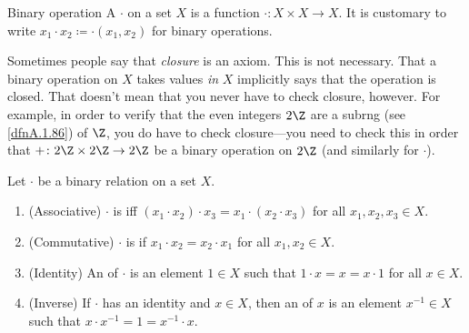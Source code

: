 \begin{dfn}{Binary operation}{}
A  $\cdot$ on a set $X$ is a function $\cdot :X\times X\rightarrow X$.  It is customary to write $x_1\cdot x_2\coloneqq \cdot (x_1,x_2)$ for binary operations.
\begin{rmk}
Sometimes people say that \emph{closure} is an axiom.  This is not necessary.  That a binary operation on $X$ takes values \emph{in} $X$ implicitly says that the operation is closed.  That doesn't mean that you never have to check closure, however.  For example, in order to verify that the even integers $2\Z$ are a subrng (see \cref{dfnA.1.86}) of $\Z$, you do have to check closure---you need to check this in order that $+\colon 2\Z \times 2\Z \rightarrow 2\Z$ be a binary operation on $2\Z$ (and similarly for $\cdot$).
\end{rmk}
\end{dfn}
\begin{dfn}{}{}
Let $\cdot$ be a binary relation on a set $X$.
\begin{enumerate}
\item (Associative) $\cdot$ is  iff $(x_1\cdot x_2)\cdot x_3=x_1\cdot (x_2\cdot x_3)$ for all $x_1,x_2,x_3\in X$.
\item (Commutative) $\cdot$ is  if $x_1\cdot x_2=x_2\cdot x_1$ for all $x_1,x_2\in X$.
\item (Identity) An  of $\cdot$ is an element $1\in X$ such that $1\cdot x=x=x\cdot 1$ for all $x\in X$.
\item (Inverse) If $\cdot$ has an identity and $x\in X$, then an  of $x$ is an element $x^{-1}\in X$ such that $x\cdot x^{-1}=1=x^{-1}\cdot x$.
\end{enumerate}
\end{dfn}

